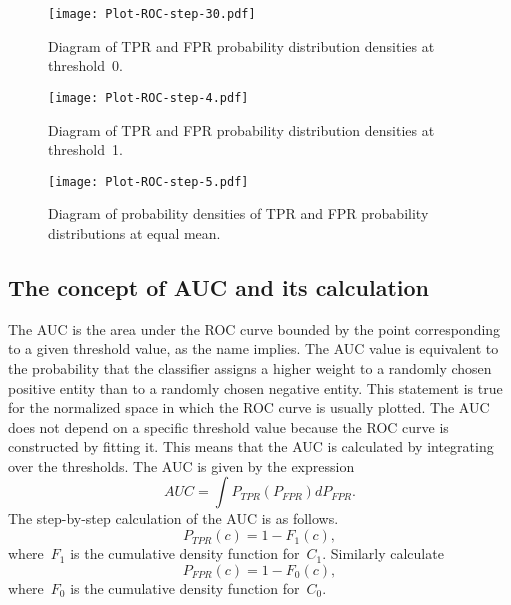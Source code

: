 \documentclass[]{scrreprt}
\begin{document}
%
\begin{figure}[htp]
	\centering
	\texttt{[image: Plot-ROC-step-30.pdf]}
	\caption{Diagram of TPR and FPR probability distribution densities at threshold~0.}
	\label{fig:plot-TPR-FPR-prob-density-3}
\end{figure}
%
\begin{figure}[htp]
	\centering
	\texttt{[image: Plot-ROC-step-4.pdf]}
	\caption{Diagram of TPR and FPR probability distribution densities at threshold~1.}
	\label{fig:plot-TPR-FPR-prob-density-4}
\end{figure}
%
\begin{figure}[htp]
	\centering
	\texttt{[image: Plot-ROC-step-5.pdf]}
	\caption{Diagram of probability densities of TPR and FPR probability distributions at equal mean.}
	\label{fig:plot-TPR-FPR-prob-density-5}
\end{figure}
%
\subsection{The concept of AUC and its calculation}
The AUC is the area under the ROC curve bounded by the point corresponding to a given threshold value, as the name implies. The AUC value is equivalent to the probability that the classifier assigns a higher weight to a randomly chosen positive entity than to a randomly chosen negative entity. This statement is true for the normalized space in which the ROC curve is usually plotted. The AUC does not depend on a specific threshold value because the ROC curve is constructed by fitting it. This means that the AUC is calculated by integrating over the thresholds. The AUC is given by the expression
\begin{equation}\label{eq:AUC-computation-0}
AUC = \int P_{TPR}(P_{FPR}) d P_{FPR}.
\end{equation}
The step-by-step calculation of the AUC is as follows.
\begin{equation}\label{eq:AUC-computation-1}
P_{TPR}(c) = 1 - F_{1}(c),
\end{equation}
where~$F_{1}$ is the cumulative density function for~$C_{1}$. Similarly calculate
\begin{equation}\label{eq:AUC-computation-2}
P_{FPR}(c) = 1 - F_{0}(c),
\end{equation}
where~$F_{0}$ is the cumulative density function for~$C_{0}$.
\end{document}
